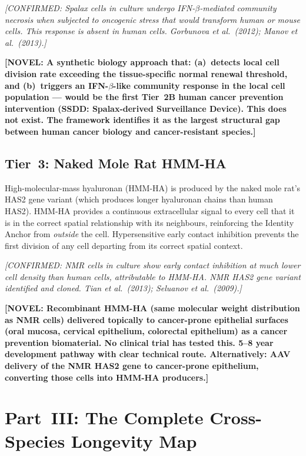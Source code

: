 \documentclass[12pt,a4paper]{article}
\newcommand{\novel}[1]{\textbf{[NOVEL: #1]}}
\newcommand{\confirmed}[1]{\textit{[CONFIRMED: #1]}}
\begin{document}
\confirmed{Spalax cells in culture undergo IFN-$\beta$-mediated community
necrosis when subjected to oncogenic stress that would transform human or mouse
cells. This response is absent in human cells. Gorbunova et al.\ (2012);
Manov et al.\ (2013).}

\novel{A synthetic biology approach that: (a)~detects local cell division rate
exceeding the tissue-specific normal renewal threshold, and (b)~triggers an
IFN-$\beta$-like community response in the local cell population --- would be
the first Tier~2B human cancer prevention intervention (SSDD: Spalax-derived
Surveillance Device). This does not exist. The framework identifies it as the
largest structural gap between human cancer biology and cancer-resistant
species.}

\subsection{Tier~3: Naked Mole Rat HMM-HA}

High-molecular-mass hyaluronan (HMM-HA) is produced by the naked mole rat's
HAS2 gene variant (which produces longer hyaluronan chains than human HAS2).
HMM-HA provides a continuous extracellular signal to every cell that it is in
the correct spatial relationship with its neighbours, reinforcing the Identity
Anchor from \textit{outside} the cell. Hypersensitive early contact inhibition
prevents the first division of any cell departing from its correct spatial
context.

\confirmed{NMR cells in culture show early contact inhibition at much lower
cell density than human cells, attributable to HMM-HA. NMR HAS2 gene variant
identified and cloned. Tian et al.\ (2013); Seluanov et al.\ (2009).}

\novel{Recombinant HMM-HA (same molecular weight distribution as NMR cells)
delivered topically to cancer-prone epithelial surfaces (oral mucosa, cervical
epithelium, colorectal epithelium) as a cancer prevention biomaterial. No
clinical trial has tested this. 5--8 year development pathway with clear
technical route. Alternatively: AAV delivery of the NMR HAS2 gene to
cancer-prone epithelium, converting those cells into HMM-HA producers.}

\section{Part~III: The Complete Cross-Species Longevity Map}
\end{document}
